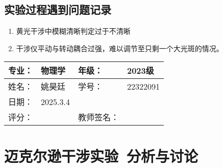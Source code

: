 \documentclass[dvipsnames, svgnames,a4paper,11pt]{article}
\newcommand{\exname}{迈克尔逊干涉实验}%
\begin{document}
\subsection{实验过程遇到问题记录}
\begin{enumerate}
	\item 黄光干涉中模糊清晰判定过于不清晰
	\item 干涉仪平动与转动耦合过强，难以调节至只剩一个大光斑的情况。
\end{enumerate}

\clearpage
{}
\begin{table}
	\renewcommand\arraystretch{1.7}
	\begin{tabularx}{\textwidth}{|X|X|X|X|}
	\hline
	专业：& 物理学 &年级：& 2023级\\
	\hline
	姓名： &姚昊廷& 学号：&22322091 \\
	\hline
    日期：&2025.3.4 &  &\\
	\hline
	评分：&&教师签名：&\\
	\hline
	\end{tabularx}
\end{table}

\section{\exname\ \textbf{分析与讨论}}
\end{document}

